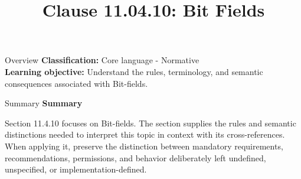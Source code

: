 \documentclass[10pt,letterpaper]{article}
\title{Clause 11.04.10: Bit Fields}
\author{}
\date{}
\begin{document}
\maketitle
\begin{CornellOverviewBox}{Overview}
\textbf{Classification:} Core language - Normative\\[2pt]
\textbf{Learning objective:} Understand the rules, terminology, and semantic consequences associated with Bit-fields.
\end{CornellOverviewBox}\begin{CornellSummaryBox}{Summary}
{\sffamily\bfseries\color{Accent} Summary}\par\vspace{3pt}Section 11.4.10 focuses on Bit-fields. The section supplies the rules and semantic distinctions needed to interpret this topic in context with its cross-references. When applying it, preserve the distinction between mandatory requirements, recommendations, permissions, and behavior deliberately left undefined, unspecified, or implementation-defined.
\end{CornellSummaryBox}
\end{document}
